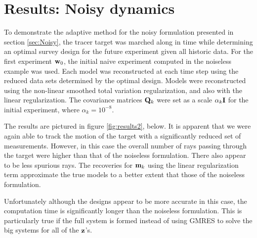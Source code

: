 \documentclass[11pt]{article}
\newcommand{\bfI}	{{\bf{I}}}
\newcommand{\bfQ}	{{\bf{Q}}}
\newcommand{\bfm}	{{\bf{m}}}
\newcommand{\bfw}	{{\bf{w}}}
\newcommand{\bfz}	{{\bf{z}}}
\begin{document}
\section{Results: Noisy  dynamics}
\label{sec: Example2}
To demonstrate the adaptive method for the noisy formulation presented in section \ref{sec:Noisy},  the tracer target was  marched along in time while determining an optimal survey design for the future experiment given all historic data. For the first experiment $\bfw_0$, the initial naive experiment computed in the noiseless example was used. Each model was reconstructed at each time step using the reduced data sets determined by the optimal design. Models were reconstructed using the non-linear smoothed total variation regularization, and also with the linear regularization. 
The covariance matrices $\bfQ_k$ were set as a scale $\alpha_k \bfI$ for the initial experiment, where $\alpha_k= 10^{-8}$. 

The results are pictured in figure \ref{fig:results2}, below. It is apparent that we were again able to track the motion of the target with a significantly reduced set of measurements. However, in this case the overall number of rays passing through the target were higher than that of the noiseless formulation. There also appear to be less  spurious rays. The recoveries for $\bfm_k$ using the linear regularization term approximate the true models to a better extent that those of the noiseless formulation. 

Unfortunately although the designs appear to be more accurate in this case, the computation time is significantly longer than the noiseless formulation. This is particularly true if the full system is formed instead of using GMRES to solve the big systems for all of the $\bfz$'s. 


\end{document}
